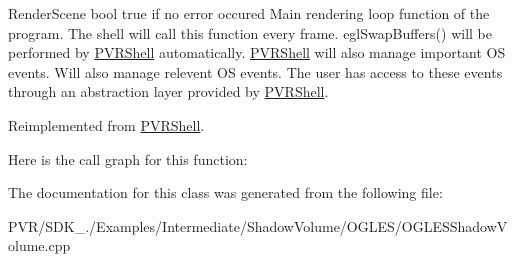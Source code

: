  Render\+Scene  bool true if no error occured  Main rendering loop function of the program. The shell will call this function every frame. egl\+Swap\+Buffers() will be performed by \hyperlink{class_p_v_r_shell}{P\+V\+R\+Shell} automatically. \hyperlink{class_p_v_r_shell}{P\+V\+R\+Shell} will also manage important O\+S events. Will also manage relevent O\+S events. The user has access to these events through an abstraction layer provided by \hyperlink{class_p_v_r_shell}{P\+V\+R\+Shell}. 

Reimplemented from \hyperlink{class_p_v_r_shell_ae0eb5f797cbe993a22b8659f9c332578}{P\+V\+R\+Shell}.



Here is the call graph for this function\+:




The documentation for this class was generated from the following file\+:\begin{DoxyCompactItemize}
\item 
P\+V\+R/\+S\+D\+K\+\_./\+Examples/\+Intermediate/\+Shadow\+Volume/\+O\+G\+L\+E\+S/O\+G\+L\+E\+S\+Shadow\+Volume.\+cpp\end{DoxyCompactItemize}
